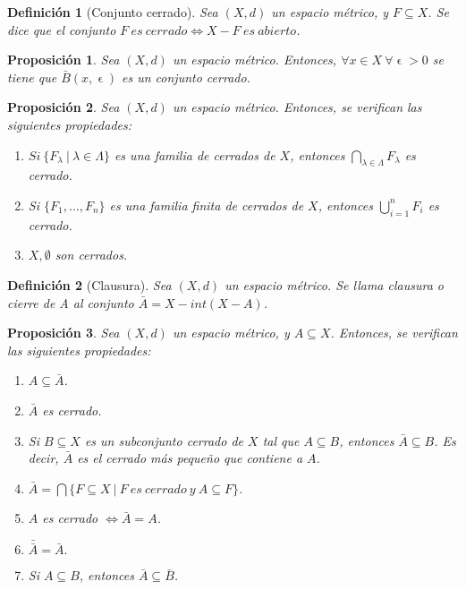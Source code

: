 \documentclass[11pt, a4paper, titlepage]{article}
\let\epsilon\upvarepsilon
\theoremstyle{theorem-style}
\newtheorem*{nprop}{Proposición}
\theoremstyle{definition-style}
\newtheorem*{ndef}{Definición}
\theoremstyle{remark-style}
\theoremstyle{example-style}
\newenvironment{nlist}
{\begin{enumerate}
\renewcommand\labelenumi{(\emph{\roman{enumi})}}}
{\end{enumerate}}
\begin{document}
\begin{ndef}[Conjunto cerrado]
Sea $(X,d)$ un espacio métrico, y $F\subseteq X$. Se dice que el conjunto $F\ es\ cerrado \iff X-F\ es\ abierto$.
\end{ndef}



\begin{nprop}
Sea $(X,d)$ un espacio métrico. Entonces, $\forall x\in X \ \forall \epsilon > 0$ se tiene que $\bar{B}(x,\epsilon)$ es un conjunto cerrado.
\end{nprop}



\begin{nprop}
Sea $(X,d)$ un espacio métrico. Entonces, se verifican las siguientes propiedades:

\begin{nlist}
\item $Si\ \{F_\lambda \ | \ \lambda \in \Lambda \}$ es una familia de cerrados de $X$, entonces $\displaystyle \bigcap_{\lambda \in \Lambda} F_\lambda$ es cerrado.

\item Si $\{F_1,\dots, F_n\}$ es una familia finita de cerrados de $X$, entonces $\displaystyle \bigcup_{i=1}^n F_i$ es cerrado.

\item $X,\emptyset$ son cerrados.
\end{nlist}

\end{nprop}



\begin{ndef}[Clausura]
Sea $(X,d)$ un espacio métrico. Se llama \textit{clausura o cierre de A} al conjunto $\bar{A} = X - int(X-A)$.
\end{ndef}



\begin{nprop}
Sea $(X,d)$ un espacio métrico, y $A\subseteq X$. Entonces, se verifican las siguientes propiedades:
\begin{nlist}
\item $A \subseteq \bar{A}$.

\item $\bar{A}$ es cerrado.

\item Si $B\subseteq X$ es un subconjunto cerrado de $X$ tal que $A\subseteq B$, entonces $\bar{A} \subseteq B$. Es decir, $\bar{A}$ es el cerrado más pequeño que contiene a $A$.

\item $\displaystyle \bar{A}  = \bigcap \{ F\subseteq X \ | \ F\ es\ cerrado\ y\ A\subseteq F \}$.

\item $A$ es cerrado $\iff \bar{A} = A$.

\item $\bar{\bar{A}} = \bar{A}.$

\item Si $A\subseteq B$, entonces $\bar{A} \subseteq \bar{B}$.
\end{nlist}

\end{nprop}
\end{document}
